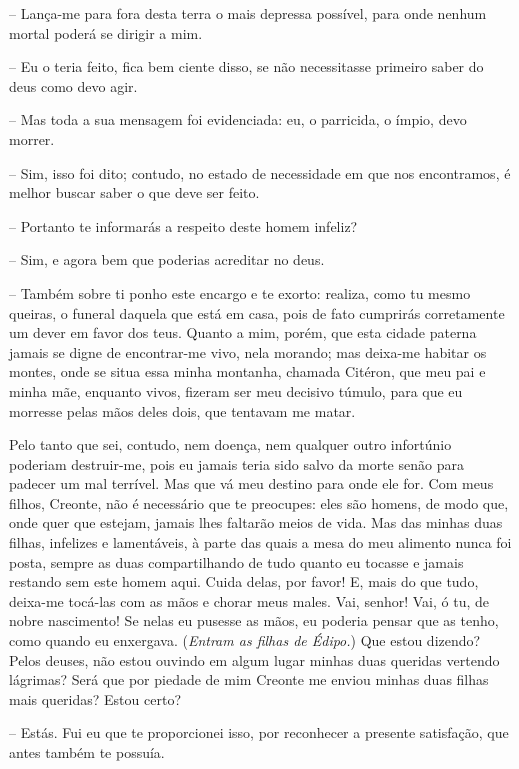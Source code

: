  --   Lança-me para fora desta terra o mais depressa possível, para onde
nenhum mortal poderá se dirigir a mim.

 --   Eu o teria feito, fica bem ciente disso, se não necessitasse primeiro
saber do deus como devo agir.

 --    Mas toda a sua mensagem foi evidenciada: eu, o parricida, o
ímpio, devo morrer.

 --   Sim, isso foi dito; contudo, no estado de necessidade em que nos
encontramos, é melhor buscar saber o que deve ser feito.

 --   Portanto te informarás a respeito deste homem infeliz?

 --   Sim, e agora bem que poderias acreditar no deus.

 --   Também sobre ti ponho este encargo e te exorto: realiza, como tu mesmo
queiras, o funeral daquela que está em casa, pois de fato cumprirás
corretamente um dever em favor dos teus. Quanto a mim, porém, que esta
cidade paterna jamais se digne  de encontrar-me vivo, nela
morando; mas deixa-me habitar os montes, onde se situa essa minha
montanha, chamada Citéron, que meu pai e minha mãe, enquanto vivos,
fizeram ser meu decisivo túmulo, para que eu morresse pelas mãos deles
dois, que tentavam me matar.

Pelo tanto que sei, contudo, nem doença, nem qualquer outro infortúnio
poderiam destruir-me, pois eu jamais teria sido salvo da morte senão
para padecer um mal terrível. Mas que vá meu destino para onde ele for.
Com meus filhos, Creonte, não  é necessário que te preocupes: eles
são homens, de modo que, onde quer que estejam, jamais lhes faltarão
meios de vida. Mas das minhas duas filhas, infelizes e lamentáveis, à
parte das quais a mesa do meu alimento nunca foi posta, sempre as duas
compartilhando de tudo quanto eu tocasse e jamais restando sem este
homem aqui. Cuida delas, por favor! E, mais do que tudo, deixa-me
tocá-las com as mãos e chorar meus males. Vai, senhor! Vai, ó tu, de
nobre nascimento! Se nelas eu pusesse as mãos,  eu poderia pensar
que as tenho, como quando eu enxergava. (\emph{Entram as filhas de
Édipo.}) Que estou dizendo? Pelos deuses, não estou ouvindo em algum
lugar minhas duas queridas vertendo lágrimas? Será que por piedade de
mim Creonte me enviou minhas duas filhas mais queridas? Estou certo?

 --   Estás. Fui eu que te proporcionei isso, por reconhecer a presente
satisfação, que antes também te possuía.

